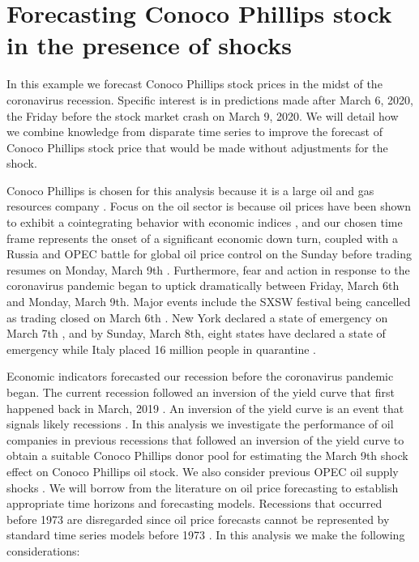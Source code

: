 \documentclass[11pt]{article}
\theoremstyle{definition}
\begin{document}
\section{Forecasting Conoco Phillips stock in the presence of shocks}
\label{forecasting}
In this example we forecast Conoco Phillips stock prices in the midst of the coronavirus recession. Specific interest is in predictions made after March 6, 2020, the Friday before the stock market crash on March 9, 2020. We will detail how we combine knowledge from disparate time series to improve the forecast of Conoco Phillips stock price that would be made without adjustments for the shock. %


Conoco Phillips is chosen for this analysis because it is a large oil and gas resources company \citep{conocowhatwedo}. %
Focus on the oil sector is because oil prices have been shown to exhibit a cointegrating behavior with economic indices \citep{he2010global}, and our chosen time frame represents the onset of a significant economic down turn, coupled with a Russia and OPEC battle for global oil price control on the Sunday before trading resumes on Monday, March 9th \citep{sukhankin2020russian}. Furthermore, fear and action in response to the coronavirus pandemic began to uptick dramatically between Friday, March 6th and Monday, March 9th. Major events include the SXSW festival being cancelled as trading closed on March 6th \citep{wang2020impact}. New York declared a state of emergency on March 7th \citep{nygov}, and by Sunday, March 8th, eight states have declared a state of emergency \citep{alonso2020state} while Italy placed 16 million people in quarantine \citep{sjodin2020only}.


Economic indicators forecasted our recession before the coronavirus pandemic began. The current recession followed an inversion of the yield curve that first happened back in March, 2019 \citep{tokic2019yield}. An inversion of the yield curve is an event that signals likely recessions \citep{andolfatto2018yield, bauer2018economic}. In this analysis we investigate the performance of oil companies in previous recessions that followed an inversion of the yield curve to obtain a suitable Conoco Phillips donor pool for estimating the March 9th shock effect on Conoco Phillips oil stock. We also consider previous OPEC oil supply shocks \citep{mensi2014opec}. We will borrow from the literature on oil price forecasting to establish appropriate time horizons and forecasting models. Recessions that occurred before 1973 are disregarded since oil price forecasts cannot be represented by standard time series models before 1973 \citep{alquist2013forecasting}. In this analysis we make the following considerations:
\end{document}
